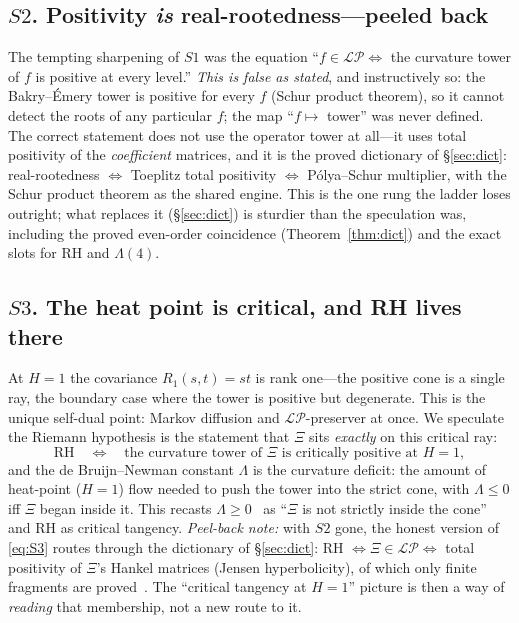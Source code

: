 \documentclass[11pt,reqno]{amsart}
\theoremstyle{plain}
\theoremstyle{definition}
\theoremstyle{remark}
\newcommand{\LP}{\mathcal{LP}}
\begin{document}
\subsection*{$S2$. Positivity \emph{is} real-rootedness---peeled back}
The tempting sharpening of $S1$ was the equation ``$f\in\LP\iff$ the
curvature tower of $f$ is positive at every level.'' \emph{This is false
as stated}, and instructively so: the Bakry--\'Emery tower is positive
for every $f$ (Schur product theorem), so it cannot detect the roots of
any particular $f$; the map ``$f\mapsto$ tower'' was never defined. The
correct statement does not use the operator tower at all---it uses total
positivity of the \emph{coefficient} matrices, and it is the proved
dictionary of \S\ref{sec:dict}: real-rootedness $\Leftrightarrow$ Toeplitz
total positivity $\Leftrightarrow$ P\'olya--Schur multiplier, with the
Schur product theorem as the shared engine. This is the one rung the
ladder loses outright; what replaces it (\S\ref{sec:dict}) is sturdier
than the speculation was, including the proved even-order coincidence
(Theorem~\ref{thm:dict}) and the exact slots for RH and $\Lambda(4)$.

\subsection*{$S3$. The heat point is critical, and RH lives there}
At $H=1$ the covariance $R_1(s,t)=st$ is rank one---the positive cone is
a single ray, the boundary case where the tower is positive but
degenerate. This is the unique self-dual point: Markov diffusion and
$\LP$-preserver at once. We speculate the Riemann hypothesis is the
statement that $\Xi$ sits \emph{exactly} on this critical ray:
\begin{equation}\label{eq:S3}
   \text{RH}\quad\Longleftrightarrow\quad
   \text{the curvature tower of $\Xi$ is critically positive at }H=1,
\end{equation}
and the de Bruijn--Newman constant $\Lambda$ is the curvature deficit:
the amount of heat-point ($H=1$) flow needed to push the tower into the
strict cone, with $\Lambda\le0$ iff $\Xi$ began inside it. This recasts
$\Lambda\ge0$~\cite{RodgersTao} as ``$\Xi$ is not strictly inside the
cone'' and RH as critical tangency. \emph{Peel-back note:} with $S2$
gone, the honest version of \eqref{eq:S3} routes through the dictionary
of \S\ref{sec:dict}: RH $\Leftrightarrow\Xi\in\LP\Leftrightarrow$ total
positivity of $\Xi$'s Hankel matrices (Jensen hyperbolicity), of which
only finite fragments are proved~\cite{GORZ}. The ``critical tangency at
$H=1$'' picture is then a way of \emph{reading} that membership, not a
new route to it.
\end{document}
